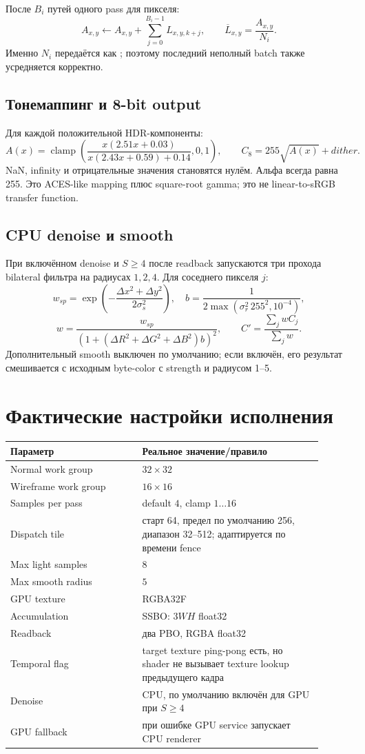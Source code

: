 \documentclass[11pt,a4paper]{article}
\newcommand{\code}[1]{\path{#1}}
\begin{document}
После $B_i$ путей одного pass для пикселя:
\[
 A_{x,y}\leftarrow A_{x,y}+\sum_{j=0}^{B_i-1}L_{x,y,k+j},
 \qquad \overline L_{x,y}=\frac{A_{x,y}}{N_i}.
\]
Именно $N_i$ передаётся как \code{uSampleCount}; поэтому последний неполный batch
также усредняется корректно.

\subsection{Тонемаппинг и 8-bit output}

Для каждой положительной HDR-компоненты:
\[
 A(x)=\operatorname{clamp}\left(
 \frac{x(2.51x+0.03)}{x(2.43x+0.59)+0.14},0,1\right),
 \qquad C_{8}=255\sqrt{A(x)}+dither.
\]
NaN, infinity и отрицательные значения становятся нулём. Альфа всегда равна 255.
Это ACES-like mapping плюс square-root gamma; это не linear-to-sRGB transfer function.

\subsection{CPU denoise и smooth}

При включённом denoise и $S\ge4$ после readback запускаются три прохода bilateral
фильтра на радиусах $1,2,4$. Для соседнего пикселя $j$:
\[
 w_{sp}=\exp\left(-\frac{\Delta x^2+\Delta y^2}{2\sigma_s^2}\right),\quad
 b=\frac{1}{2\max(\sigma_r^2\,255^2,10^{-4})},
\]
\[
 w=\frac{w_{sp}}{\left(1+(\Delta R^2+\Delta G^2+\Delta B^2)b\right)^2},
 \qquad C'=\frac{\sum_jwC_j}{\sum_jw}.
\]
Дополнительный smooth выключен по умолчанию; если включён, его результат смешивается
с исходным byte-color с strength и радиусом 1--5.

\section{Фактические настройки исполнения}

\begin{longtable}{p{0.38\linewidth}p{0.52\linewidth}}
\toprule
Параметр & Реальное значение/правило \\
\midrule
Normal work group & $32\times32$ \\
Wireframe work group & $16\times16$ \\
Samples per pass & default $4$, clamp $1\ldots16$ \\
Dispatch tile & старт 64, предел по умолчанию 256, диапазон 32--512; адаптируется по времени fence \\
Max light samples & $8$ \\
Max smooth radius & $5$ \\
GPU texture & RGBA32F \\
Accumulation & SSBO: $3WH$ float32 \\
Readback & два PBO, RGBA float32 \\
Temporal flag & target texture ping-pong есть, но shader не вызывает texture lookup предыдущего кадра \\
Denoise & CPU, по умолчанию включён для GPU при $S\ge4$ \\
GPU fallback & при ошибке GPU service запускает CPU renderer \\
\bottomrule
\end{longtable}
\end{document}
